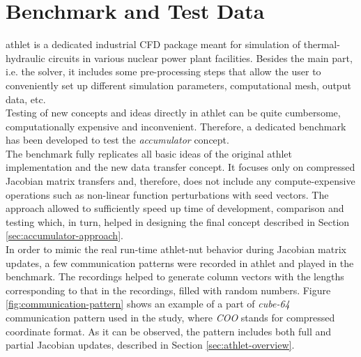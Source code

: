 \section{Benchmark and Test Data}
\label{sec:benchmark-and-test-data}


\acrshort{athlet} is a dedicated industrial CFD package meant for simulation of thermal-hydraulic circuits in various nuclear power plant facilities. Besides the main part, i.e. the solver, it includes some pre-processing steps that allow the user to conveniently set up different simulation parameters, computational mesh, output data, etc.\\


Testing of new concepts and ideas directly in \acrshort{athlet} can be quite cumbersome, computationally expensive and inconvenient. Therefore, a dedicated benchmark has been developed to test the \textit{accumulator} concept.\\


The benchmark fully replicates all basic ideas of the original \acrshort{athlet} implementation and the new data transfer concept. It  focuses only on compressed Jacobian matrix transfers and, therefore, does not include any compute-expensive operations such as non-linear function perturbations with seed vectors. The approach allowed to sufficiently speed up time of development, comparison and testing which, in turn, helped in designing the final concept described in Section \ref{sec:accumulator-approach}.\\%


In order to mimic the real run-time \acrshort{athlet}-\acrshort{nut} behavior during Jacobian matrix updates, a few communication patterns were recorded in \acrshort{athlet} and played in the benchmark. The recordings helped to generate column vectors with the lengths corresponding to that in the recordings, filled with random numbers. Figure \ref{fig:communication-pattern} shows an example of a part of  \textit{cube-64} communication pattern used in the study, where \textit{COO} stands for compressed coordinate format. As it can be observed, the pattern includes both full and partial Jacobian updates, described in Section \ref{sec:athlet-overview}.


